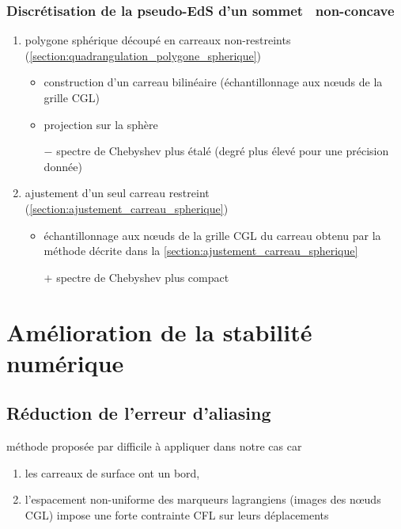 \subsubsection{Discrétisation de la pseudo-EdS d'un sommet \brep\ non-concave}
\begin{enumerate}
	\item polygone sphérique découpé en carreaux non-restreints (\cf \autoref{section:quadrangulation_polygone_spherique})
	\begin{itemize}
		\item construction d'un carreau bilinéaire (échantillonnage aux n\oe uds de la grille CGL)
		\item projection sur la sphère
		\item[$-$] spectre de Chebyshev plus étalé (degré plus élevé pour une précision donnée)
	\end{itemize}
	\item ajustement d'un seul carreau restreint (\cf \autoref{section:ajustement_carreau_spherique})
	\begin{itemize}
		\item échantillonnage aux n\oe uds de la grille CGL du carreau obtenu par la méthode décrite dans la \autoref{section:ajustement_carreau_spherique}
		\item[$+$] spectre de Chebyshev plus compact
	\end{itemize}
\end{enumerate}




\section{Amélioration de la stabilité numérique}
\label{section:instabilités}

\subsection{Réduction de l'erreur d'aliasing}

méthode proposée par \cite{rahimian2015} difficile à appliquer dans notre cas car 
\begin{enumerate}
	\item les carreaux de surface ont un bord, 
	\item l'espacement non-uniforme des marqueurs lagrangiens (images des n\oe uds CGL) impose une forte contrainte CFL sur leurs déplacements
\end{enumerate}


